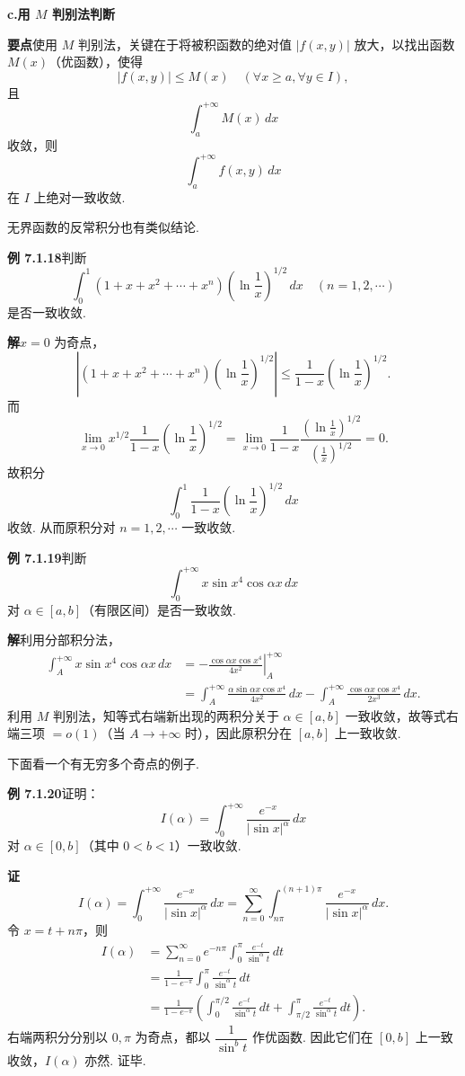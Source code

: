\documentclass[UTF8,12pt,a4paper,fontset=fandol]{ctexart}
\begin{document}
\noindent\textbf{c.\quad 用 $M$ 判别法判断}

\noindent\textbf{要点}\quad 使用 $M$ 判别法，关键在于将被积函数的绝对值 $|f(x,y)|$ 放大，以找出函数 $M(x)$（优函数），使得
\[
|f(x,y)|\le M(x)\quad(\forall x\ge a,\forall y\in I),
\]
且
\[
\int_a^{+\infty}M(x)\,dx
\]
收敛，则
\[
\int_a^{+\infty}f(x,y)\,dx
\]
在 $I$ 上绝对一致收敛.

无界函数的反常积分也有类似结论.

\noindent\textbf{例 7.1.18}\quad 判断
\[
\int_0^1(1+x+x^2+\cdots+x^n)\left(\ln\frac1x\right)^{1/2}\,dx
\quad(n=1,2,\cdots)
\]
是否一致收敛.

\noindent\textbf{解}\quad $x=0$ 为奇点，
\[
\left|(1+x+x^2+\cdots+x^n)\left(\ln\frac1x\right)^{1/2}\right|
\le\frac1{1-x}\left(\ln\frac1x\right)^{1/2}.
\]
而
\[
\lim_{x\to0}x^{1/2}\frac1{1-x}\left(\ln\frac1x\right)^{1/2}
=\lim_{x\to0}\frac1{1-x}\frac{\left(\ln\frac1x\right)^{1/2}}{\left(\frac1x\right)^{1/2}}
=0.
\]
故积分
\[
\int_0^1\frac1{1-x}\left(\ln\frac1x\right)^{1/2}\,dx
\]
收敛. 从而原积分对 $n=1,2,\cdots$ 一致收敛.

\noindent\textbf{例 7.1.19}\quad 判断
\[
\int_0^{+\infty}x\sin x^4\cos\alpha x\,dx
\]
对 $\alpha\in[a,b]$（有限区间）是否一致收敛.

\noindent\textbf{解}\quad 利用分部积分法，
\[
\begin{aligned}
\int_A^{+\infty}x\sin x^4\cos\alpha x\,dx
&=-\left.\frac{\cos\alpha x\cos x^4}{4x^2}\right|_A^{+\infty}\\
&=\int_A^{+\infty}\frac{\alpha\sin\alpha x\cos x^4}{4x^2}\,dx
-\int_A^{+\infty}\frac{\cos\alpha x\cos x^4}{2x^3}\,dx.
\end{aligned}
\]
利用 $M$ 判别法，知等式右端新出现的两积分关于 $\alpha\in[a,b]$ 一致收敛，故等式右端三项 $=o(1)$（当 $A\to+\infty$ 时），因此原积分在 $[a,b]$ 上一致收敛.

下面看一个有无穷多个奇点的例子.

\noindent\textbf{例 7.1.20}\quad 证明：
\[
I(\alpha)=\int_0^{+\infty}\frac{e^{-x}}{|\sin x|^\alpha}\,dx
\]
对 $\alpha\in[0,b]$（其中 $0<b<1$）一致收敛.

\noindent\textbf{证}\quad
\[
I(\alpha)=\int_0^{+\infty}\frac{e^{-x}}{|\sin x|^\alpha}\,dx
=\sum_{n=0}^{\infty}\int_{n\pi}^{(n+1)\pi}\frac{e^{-x}}{|\sin x|^\alpha}\,dx.
\]
令 $x=t+n\pi$，则
\[
\begin{aligned}
I(\alpha)
&=\sum_{n=0}^{\infty}e^{-n\pi}\int_0^\pi\frac{e^{-t}}{\sin^\alpha t}\,dt\\
&=\frac1{1-e^{-\pi}}\int_0^\pi\frac{e^{-t}}{\sin^\alpha t}\,dt\\
&=\frac1{1-e^{-\pi}}\left(\int_0^{\pi/2}\frac{e^{-t}}{\sin^\alpha t}\,dt
+\int_{\pi/2}^{\pi}\frac{e^{-t}}{\sin^\alpha t}\,dt\right).
\end{aligned}
\]
右端两积分分别以 $0,\pi$ 为奇点，都以 $\dfrac1{\sin^bt}$ 作优函数. 因此它们在 $[0,b]$ 上一致收敛，$I(\alpha)$ 亦然. 证毕.
\end{document}
